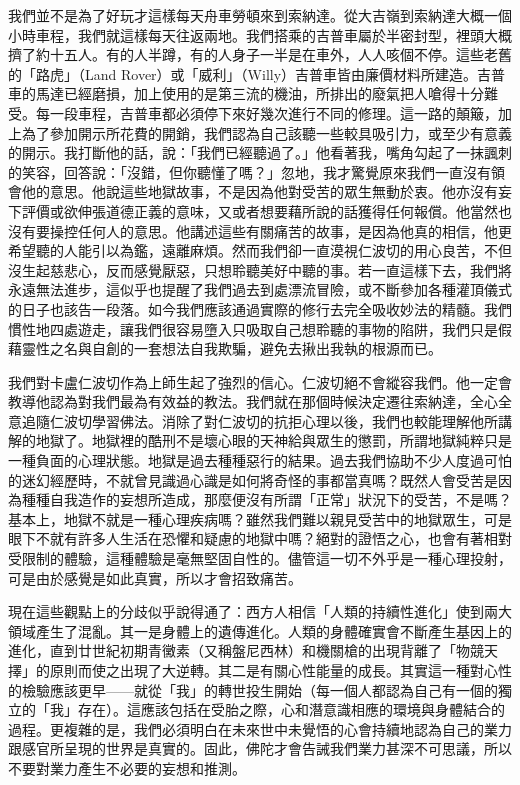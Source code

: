 我們並不是為了好玩才這樣每天舟車勞頓來到索納達。從大吉嶺到索納達大概一個小時車程，我們就這樣每天往返兩地。我們搭乘的吉普車屬於半密封型，裡頭大概擠了約十五人。有的人半蹲，有的人身子一半是在車外，人人咳個不停。這些老舊的「路虎」（Land
Rover）或「威利」（Willy）吉普車皆由廉價材料所建造。吉普車的馬達已經磨損，加上使用的是第三流的機油，所排出的廢氣把人嗆得十分難受。每一段車程，吉普車都必須停下來好幾次進行不同的修理。這一路的顛簸，加上為了參加開示所花費的開銷，我們認為自己該聽一些較具吸引力，或至少有意義的開示。我打斷他的話，說：「我們已經聽過了。」他看著我，嘴角勾起了一抹諷刺的笑容，回答說：「沒錯，但你聽懂了嗎？」忽地，我才驚覺原來我們一直沒有領會他的意思。他說這些地獄故事，不是因為他對受苦的眾生無動於衷。他亦沒有妄下評價或欲伸張道德正義的意味，又或者想要藉所說的話獲得任何報償。他當然也沒有要操控任何人的意思。他講述這些有關痛苦的故事，是因為他真的相信，他更希望聽的人能引以為鑑，遠離麻煩。然而我們卻一直漠視仁波切的用心良苦，不但沒生起慈悲心，反而感覺厭惡，只想聆聽美好中聽的事。若一直這樣下去，我們將永遠無法進步，這似乎也提醒了我們過去到處漂流冒險，或不斷參加各種灌頂儀式的日子也該告一段落。如今我們應該通過實際的修行去完全吸收妙法的精髓。我們慣性地四處遊走，讓我們很容易墮入只吸取自己想聆聽的事物的陷阱，我們只是假藉靈性之名與自創的一套想法自我欺騙，避免去揪出我執的根源而已。

我們對卡盧仁波切作為上師生起了強烈的信心。仁波切絕不會縱容我們。他一定會教導他認為對我們最為有效益的教法。我們就在那個時候決定遷往索納達，全心全意追隨仁波切學習佛法。消除了對仁波切的抗拒心理以後，我們也較能理解他所講解的地獄了。地獄裡的酷刑不是壞心眼的天神給與眾生的懲罰，所謂地獄純粹只是一種負面的心理狀態。地獄是過去種種惡行的結果。過去我們協助不少人度過可怕的迷幻經歷時，不就曾見識過心識是如何將奇怪的事都當真嗎？既然人會受苦是因為種種自我造作的妄想所造成，那麼便沒有所謂「正常」狀況下的受苦，不是嗎？基本上，地獄不就是一種心理疾病嗎？雖然我們難以親見受苦中的地獄眾生，可是眼下不就有許多人生活在恐懼和疑慮的地獄中嗎？絕對的證悟之心，也會有著相對受限制的體驗，這種體驗是毫無堅固自性的。儘管這一切不外乎是一種心理投射，可是由於感覺是如此真實，所以才會招致痛苦。


現在這些觀點上的分歧似乎說得通了：西方人相信「人類的持續性進化」使到兩大領域產生了混亂。其一是身體上的遺傳進化。人類的身體確實會不斷產生基因上的進化，直到廿世紀初期青黴素（又稱盤尼西林）和機關槍的出現背離了「物競天擇」的原則而使之出現了大逆轉。其二是有關心性能量的成長。其實這一種對心性的檢驗應該更早——就從「我」的轉世投生開始（每一個人都認為自己有一個的獨立的「我」存在）。這應該包括在受胎之際，心和潛意識相應的環境與身體結合的過程。更複雜的是，我們必須明白在未來世中未覺悟的心會持續地認為自己的業力跟感官所呈現的世界是真實的。固此，佛陀才會告誡我們業力甚深不可思議，所以不要對業力產生不必要的妄想和推測。

